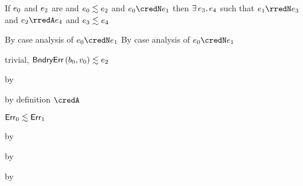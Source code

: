 \begin{lemma}\label{HA-simulation-H}\leavevmode
  If\/ $e_0$ and $e_2$ are \reducedsurfaceexpressions{}
  and\/ $e_0 \lesssim e_2$
  and\/ $\sexpr_0 \credN \sexpr_1$
  then\/ $\exists\,e_3,e_4$
  such that\/ $\sexpr_1 \rredN \sexpr_3$
  and\/ $\sexpr_2 \rredA \sexpr_4$
  and\/ $e_3 \lesssim e_4$
\end{lemma}{
  \newcommand{\shortproof}{By case analysis of $\sexpr_0 \credN \sexpr_1$}
\begin{lamportproof*}
  \shortproof
\mainproof
  \shortproof

    \begin{pfproof}
      \qedstep
        \begin{pfproof}
          trivial, $\mathsf{BndryErr}\,(b_0, v_0) \lesssim e_2$
        \end{pfproof}
    \end{pfproof}

    \begin{pfproof}
        \begin{pfproof}
          by 
        \end{pfproof}
        \begin{pfproof}
          by definition $\credA$
        \end{pfproof}
      \qedstep
        \begin{pfproof}
          $\mathsf{Err}_0 \lesssim \mathsf{Err}_1$
        \end{pfproof}
    \end{pfproof}

    \begin{pfproof}
        \begin{pfproof}
          by 
        \end{pfproof}
        \begin{pfproof}
          by 
        \end{pfproof}
      \qedstep
        by 
    \end{pfproof}


\end{lamportproof*}}
